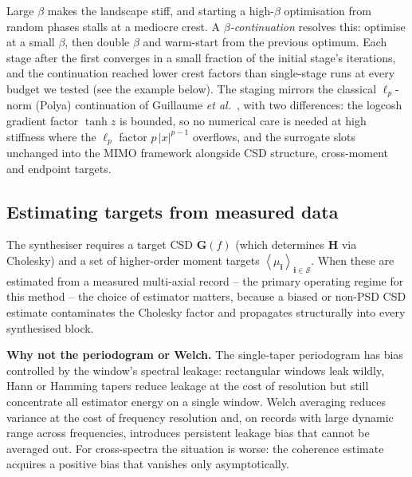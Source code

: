 \documentclass[10pt,a4paper]{article}
\numberwithin{equation}{section}
\newcommand{\abs}[1]{\left|#1\right|}
\newcommand{\seq}[1]{\left<#1\right>}
\newcommand{\mat}[1]{\left(#1\right)}
\begin{document}
Large $\beta$ makes the landscape stiff, and starting a high-$\beta$ optimisation from random phases stalls at a mediocre crest. A \emph{$\beta$-continuation} resolves this: optimise at a small $\beta$, then double $\beta$ and warm-start from the previous optimum. Each stage after the first converges in a small fraction of the initial stage's iterations, and the continuation reached lower crest factors than single-stage runs at every budget we tested (see the example below). The staging mirrors the classical $\ell_p$-norm (Polya) continuation of Guillaume \emph{et al.}~\cite{guillaume1991crest}, with two differences: the logcosh gradient factor $\tanh z$ is bounded, so no numerical care is needed at high stiffness where the $\ell_p$ factor $p\,\abs{x}^{p-1}$ overflows, and the surrogate slots unchanged into the MIMO framework alongside CSD structure, cross-moment and endpoint targets.

\subsection*{Estimating targets from measured data}

The synthesiser requires a target CSD $\mathbf{G}\mat{f}$ (which determines $\mathbf{H}$ via Cholesky) and a set of higher-order moment targets $\seq{\mu_\mathbf{i}}_{\mathbf{i}\in\mathcal{S}}$. When these are estimated from a measured multi-axial record -- the primary operating regime for this method -- the choice of estimator matters, because a biased or non-PSD CSD estimate contaminates the Cholesky factor and propagates structurally into every synthesised block.

\textbf{Why not the periodogram or Welch.} The single-taper periodogram has bias controlled by the window's spectral leakage: rectangular windows leak wildly, Hann or Hamming tapers reduce leakage at the cost of resolution but still concentrate all estimator energy on a single window. Welch averaging reduces variance at the cost of frequency resolution and, on records with large dynamic range across frequencies, introduces persistent leakage bias that cannot be averaged out. For cross-spectra the situation is worse: the coherence estimate acquires a positive bias that vanishes only asymptotically.
\end{document}
